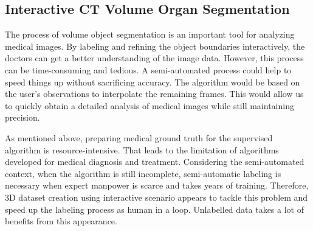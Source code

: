 \subsection{Interactive CT Volume Organ Segmentation}
The process of volume object segmentation is an important tool for analyzing medical images. By labeling and refining the object boundaries interactively, the doctors can get a better understanding of the image data. However, this process can be time-consuming and tedious. A semi-automated process could help to speed things up without sacrificing accuracy. The algorithm would be based on the user's observations to interpolate the remaining frames. This would allow us to quickly obtain a detailed analysis of medical images while still maintaining precision.

As mentioned above, preparing medical ground truth for the supervised algorithm is resource-intensive. That leads to the limitation of algorithms developed for medical diagnosis and treatment. Considering the semi-automated context, when the algorithm is still incomplete, semi-automatic labeling is necessary when expert manpower is scarce and takes years of training. Therefore, 3D dataset creation using interactive scenario appears to tackle this problem and speed up the labeling process as human in a loop. Unlabelled data takes a lot of benefits from this appearance.

